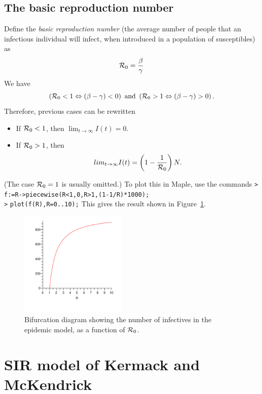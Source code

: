 \subsection{The basic reproduction number}
Define the \emph{basic reproduction number} (the average number of people that an infectious individual will infect, when introduced in a population of susceptibles) as 
\[
\mathcal{R}_0=\frac\beta\gamma
\]
We have
\[
\left(\mathcal{R}_0<1\Leftrightarrow (\beta-\gamma)<0\right)\textrm{ and }\left(\mathcal{R}_0>1\Leftrightarrow (\beta-\gamma)>0\right).
\]
Therefore, previous cases can be rewritten
\begin{itemize}
\item If $\mathcal{R}_0<1$, then $\lim_{t\to\infty}I(t)=0$.
\item If $\mathcal{R}_0>1$, then
\[
lim_{t\to\infty} I(t)=\left(1-\frac{1}{\mathcal{R}_0}\right)N.
\]
\end{itemize}
(The case $\mathcal{R}_0=1$ is usually omitted.)
To plot this in Maple, use the commands
\mbox{}\newline
{\tt >} {\red\verb!f:=R->piecewise(R<1,0,R>1,(1-1/R)*1000);!}\\
{\tt >} {\red\verb!plot(f(R),R=0..10);!}
\newline
This gives the result shown in Figure~\ref{fig:bif_R0}.
\begin{figure}[htbp]
\begin{center}
\includegraphics[width=0.45\textwidth]{../figs_04_epidemic_models/EEP_fct_R0}
\caption{Bifurcation diagram showing the number of infectives in the epidemic model, as a function of $\mathcal{R}_0$.}
\label{fig:bif_R0}
\end{center}
\end{figure}




\section{SIR model of Kermack and McKendrick}

